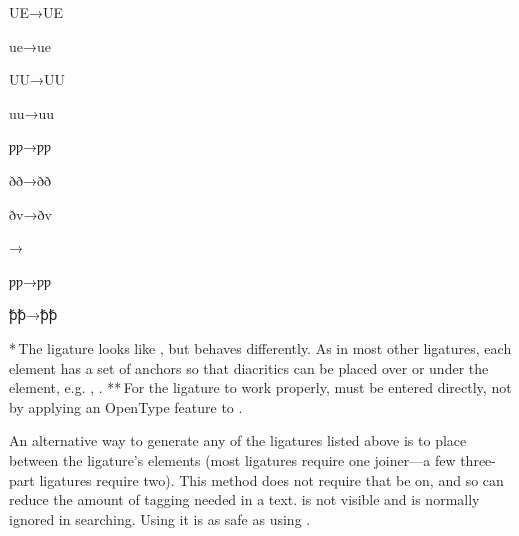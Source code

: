 \begin{multicols}{5}
{\color[rgb]{0.38039216,0.09019608,0.16078432}
U{\textcompwordmark}E\hfill→\hfill{}UE}

{\color[rgb]{0.38039216,0.09019608,0.16078432}
u{\textcompwordmark}e\hfill→\hfill{}ue}

{\color[rgb]{0.38039216,0.09019608,0.16078432}
U{\textcompwordmark}U\hfill→\hfill{}UU}

{\color[rgb]{0.38039216,0.09019608,0.16078432}
u{\textcompwordmark}u\hfill→\hfill{}uu}

{\color[rgb]{0.38039216,0.09019608,0.16078432}
ƿ{\textcompwordmark}ƿ\hfill→\hfill{}ƿƿ}

{\color[rgb]{0.38039216,0.09019608,0.16078432}
}

{\color[rgb]{0.38039216,0.09019608,0.16078432}
}

{\color[rgb]{0.38039216,0.09019608,0.16078432}
ð{\textcompwordmark}ð\hfill→\hfill{}ðð}

{\color[rgb]{0.38039216,0.09019608,0.16078432}
ð{\textcompwordmark}v\hfill→\hfill{}ðv}

{\color[rgb]{0.38039216,0.09019608,0.16078432}
{\th}\textcompwordmark{\th}\hfill→\hfill{}{\th}{\th}}

{\color[rgb]{0.38039216,0.09019608,0.16078432}
ƿ{\textcompwordmark}ƿ\hfill→\hfill{}ƿƿ}

{\color[rgb]{0.38039216,0.09019608,0.16078432}
ꝥ{\textcompwordmark}ꝥ\hfill→\hfill{}ꝥꝥ}

\end{multicols}

\noindent{}
*\,The  ligature looks like  , but behaves differently.
As in most other ligatures, each element has a set of anchors so that diacritics can be placed 
over or under the element, e.g. ,
.
**\,For the ligature  to
work properly,   must be entered directly, not by applying an OpenType feature to
.

An alternative way to generate any of the ligatures listed above is to place
 
between the ligature’s elements (most ligatures require one joiner—a few three-part ligatures require
two). This method does not require that  be on, and so can reduce 
the amount of tagging needed in a text.  is not visible and is normally ignored in searching.
Using it is as safe as using .

